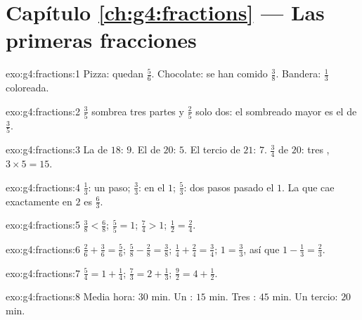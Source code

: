 \section*{Capítulo \ref{ch:g4:fractions} --- Las primeras fracciones}

\begin{solution}{exo:g4:fractions:1}
Pizza: quedan $\frac56$. Chocolate: se han comido $\frac38$. Bandera: $\frac13$
coloreada.
\end{solution}

\begin{solution}{exo:g4:fractions:2}
$\frac35$ sombrea tres partes y $\frac25$ solo dos: el sombreado mayor
es el de $\frac35$.
\end{solution}

\begin{solution}{exo:g4:fractions:3}
La  de $18$: $9$. El  de $20$: $5$. El tercio de $21$: $7$.
$\frac34$ de $20$: tres , $3 \times 5 = 15$.
\end{solution}

\begin{solution}{exo:g4:fractions:4}
$\frac13$: un paso; $\frac33$: en el $1$; $\frac53$: dos pasos pasado
el $1$. La  que cae exactamente en $2$ es $\frac63$.
\end{solution}

\begin{solution}{exo:g4:fractions:5}
$\frac38 < \frac68$; \quad $\frac55 = 1$; \quad $\frac74 > 1$;
\quad $\frac12 = \frac24$.
\end{solution}

\begin{solution}{exo:g4:fractions:6}
$\frac26 + \frac36 = \frac56$; \quad
$\frac58 - \frac28 = \frac38$; \quad
$\frac14 + \frac24 = \frac34$; \quad
$1 = \frac33$, así que $1 - \frac13 = \frac23$.
\end{solution}

\begin{solution}{exo:g4:fractions:7}
$\frac54 = 1 + \frac14$; \quad
$\frac73 = 2 + \frac13$; \quad
$\frac92 = 4 + \frac12$.
\end{solution}

\begin{solution}{exo:g4:fractions:8}
Media hora: $30$ min. Un : $15$ min. Tres : $45$
min. Un tercio: $20$ min.
\end{solution}

